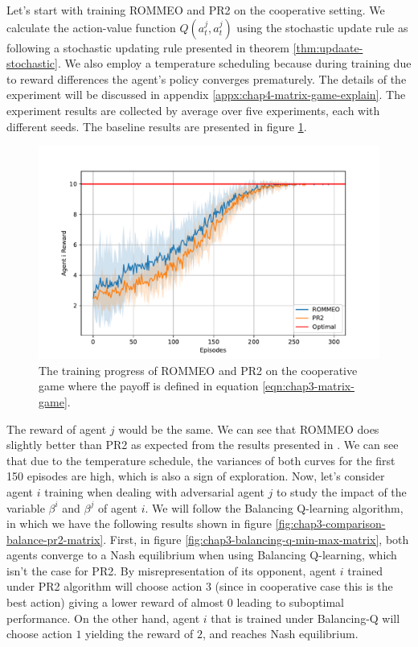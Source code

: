 Let's start with training ROMMEO \cite{tian2019regularized} and PR2 \cite{wen2019probabilistic} on the cooperative setting. We calculate the action-value function $Q(a^j_t, a^{j}_t)$ using the stochastic update rule as following a stochastic updating rule presented in theorem \ref{thm:updaate-stochastic}. We also employ a temperature scheduling because during training due to reward differences the agent's policy converges prematurely. The details of the experiment will be discussed in appendix \ref{appx:chap4-matrix-game-explain}. The experiment results are collected by average over five experiments, each with different seeds. The baseline results are presented in figure \ref{fig:chap3_ROMMEO_PR2}. 
\begin{figure}
    \centering
    \includegraphics[scale=0.55]{figures/ROMMEO_PR2_ICG.pdf}
    \caption{The training progress of ROMMEO and PR2 on the cooperative game where the payoff is defined in equation \ref{eqn:chap3-matrix-game}.}
    \label{fig:chap3_ROMMEO_PR2}
\end{figure}
The reward of agent $j$ would be the same. We can see that ROMMEO does slightly better than PR2 as expected from the results presented in \cite{tian2019regularized}. We can see that due to the temperature schedule, the variances of both curves for the first 150 episodes are high, which is also a sign of exploration. Now, let's consider agent $i$ training when dealing with adversarial agent $j$ to study the impact of the variable $\beta^i$ and $\beta^j$ of agent $i$. We will follow the Balancing Q-learning algorithm, in which we have the following results shown in figure \ref{fig:chap3-comparison-balance-pr2-matrix}. First, in figure \ref{fig:chap3-balancing-q-min-max-matrix}, both agents converge to a Nash equilibrium when using Balancing Q-learning, which isn't the case for PR2. By misrepresentation of its opponent, agent $i$ trained under PR2 algorithm will choose action $3$ (since in cooperative case this is the best action) giving a lower reward of almost $0$ leading to suboptimal performance. On the other hand, agent $i$ that is trained under Balancing-Q will choose action $1$ yielding the reward of $2$, and reaches Nash equilibrium. 
